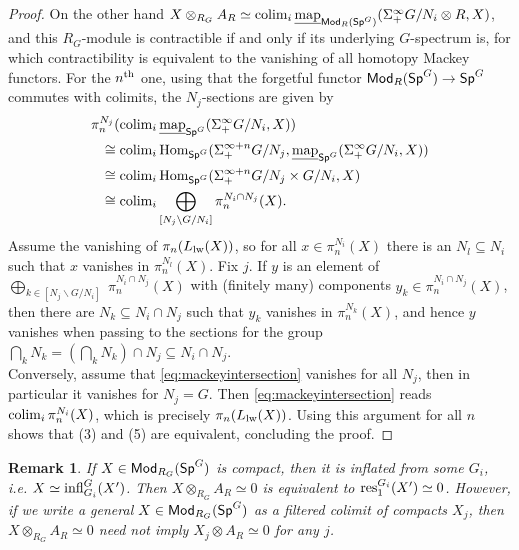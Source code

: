 \documentclass[reqno]{amsart}
\numberwithin{equation}{section}\theoremstyle{thms}
\theoremstyle{defn}
\newtheorem{rem}[equation]{Remark}
\newcommand{\tn}[1]{\textnormal{#1}}
\newcommand{\tsf}[1]{\textsf{\textup{#1}}}
\newcommand{\underl}[1]{\underline{#1}}
\newcommand{\Hom}{\tn{Hom}}
\newcommand{\imap}{\underl{\tn{map}}}
\newcommand{\Mod}{\tsf{Mod}}
\newcommand{\specg}{\tsf{Sp}^G}
\begin{document}
\begin{proof}
On the other hand $X \otimes_{R_G} A_R \simeq \tn{colim}_i \, \imap_{\Mod_R(\specg)}(\Sigma^{\infty}_+G/N_i \otimes R, X)$, and this $R_G$-module is contractible if and only if its underlying $G$-spectrum is, for which contractibility is equivalent to the vanishing of all homotopy Mackey functors. For the $n^{\tn{th}}$ one, using that the forgetful functor $\Mod_R(\specg) \to \specg$ commutes with colimits, the $N_j$-sections are given by 
\begin{align}
\pi^{N_j}_n(&\tn{colim}_i \, \imap_{\specg}(\Sigma^{\infty}_+G/N_i, X)) \notag \\
\cong \;&\tn{colim}_i \, \Hom_{\specg}(\Sigma^{\infty +n}_+G/N_j, \imap_{\specg}(\Sigma^{\infty}_+G/N_i, X)) \notag \\
\cong \;&\tn{colim}_i \, \Hom_{\specg}(\Sigma^{\infty +n}_+G/N_j \times G/N_i, X) \notag \\
\cong \;&\tn{colim}_i \bigoplus_{[N_j\backslash G /N_i]} \pi_n^{N_i\cap N_j}(X).
\label{eq:mackeyintersection}
\end{align}
Assume the vanishing of $\pi_n(L_{\tn{lw}}(X))$, so for all $x\in \pi_n^{N_i}(X)$ there is an $N_l \subseteq N_i$ such that $x$ vanishes in $\pi_n^{N_l}(X)$. Fix $j$. If $y$ is an element of  $\bigoplus_{k \in [N_j\backslash G /N_i]} \; \pi_n^{N_i\cap N_j}(X)$ with (finitely many) components $y_k \in \pi_n^{N_i \cap N_j}(X)$, then there are $N_{k} \subseteq N_i\cap N_j$ such that $y_k$ vanishes in $\pi_n^{N_{k}}(X)$, and hence $y$ vanishes when passing to the sections for the group $\bigcap_k N_{k} = (\bigcap_k N_{k}) \cap N_j \subseteq N_i \cap N_j$. \\
Conversely, assume that \ref{eq:mackeyintersection} vanishes for all $N_j$, then in particular it vanishes for $N_j=G$. Then \ref{eq:mackeyintersection} reads $\tn{colim}_i \, \pi_n^{N_i}(X)$, which is precisely $\pi_n(L_{\tn{lw}}(X))$. Using this argument for all $n$ shows that (3) and (5) are equivalent, concluding the proof.
\end{proof}

\begin{rem}
If $X \in \Mod_{R_G}(\specg)$ is compact, then it is inflated from some $G_i$, i.e. $X \simeq \tn{infl}^G_{G_i}(X')$. Then $X \otimes_{R_G} A_R \simeq 0$ is equivalent to $\tn{res}^{G_i}_1(X') \simeq 0$. However, if we write a general $X \in \Mod_{R_G}(\specg)$ as a filtered colimit of compacts $X_j$, then $X \otimes_{R_G} A_R \simeq 0$ need not imply $X_j \otimes A_R \simeq 0$ for any $j$.
\end{rem}
\end{document}
